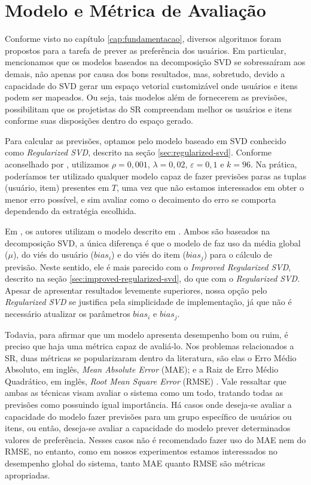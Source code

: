 \section{Modelo e Métrica de Avaliação}
\label{sec:modelo-avaliacao}

Conforme visto no capítulo \ref{cap:fundamentacao}, diversos algoritmos foram propostos para a tarefa de prever as preferência dos usuários. Em particular, mencionamos que os modelos baseados na decomposição SVD se sobressaíram aos demais, não apenas por causa dos bons resultados, mas, sobretudo, devido a capacidade do SVD gerar um espaço vetorial customizável onde usuários e itens podem ser mapeados. Ou seja, tais modelos além de fornecerem as previsões, possibilitam que os projetistas do SR compreendam melhor os usuários e itens conforme suas disposições dentro do espaço gerado. 

Para calcular as previsões, optamos pelo modelo baseado em SVD conhecido como \textit{Regularized SVD}, descrito na seção \ref{sec:regularized-svd}. Conforme aconselhado por \citep{paterek_2007}, utilizamos $\rho=0,001$, $\lambda=0,02$, $\varepsilon=0,1$ e $k=96$. Na prática, poderíamos ter utilizado qualquer modelo capaz de fazer previsões paras as tuplas (usuário, item) presentes em $T$, uma vez que não estamos interessados em obter o menor erro possível, e sim avaliar como o decaimento do erro se comporta dependendo da estratégia escolhida.

Em \citep{Elahi:2014:ALS:2542182.2542195}, os autores utilizam o modelo descrito em \citep{KorenBell_2011}. Ambos são baseados na decomposição SVD, a única diferença é que o modelo de \citep{KorenBell_2011} faz uso da média global ($\mu$), do viés do usuário ($bias_i$) e do viés do item ($bias_j$) para o cálculo de previsão. Neste sentido, ele é mais parecido com o \textit{Improved Regularized SVD}, descrito na seção \ref{sec:improved-regularized-svd}, do que com o \textit{Regularized SVD}. Apesar de apresentar resultados levemente superiores, nossa opção pelo \textit{Regularized SVD} se justifica pela simplicidade de implementação, já que não é necessário atualizar os parâmetros $bias_i$ e $bias_j$.

Todavia, para afirmar que um modelo apresenta desempenho bom ou ruim, é preciso que haja uma métrica capaz de avaliá-lo. Nos problemas relacionados a SR, duas métricas se popularizaram dentro da literatura, são elas o Erro Médio Absoluto, em inglês, \textit{Mean Absolute Error} (MAE); e a Raiz de Erro Médio Quadrático, em inglês, \textit{Root Mean Square Error} (RMSE) \citep{ricci_recommender_2011}. Vale ressaltar que ambas as técnicas visam avaliar o sistema como um todo, tratando todas as previsões como possuindo igual importância. Há casos onde deseja-se avaliar a capacidade do modelo fazer previsões para um grupo específico de usuários ou itens, ou então, deseja-se avaliar a capacidade do modelo prever determinados valores de preferência. Nesses casos não é recomendado fazer uso do MAE nem do RMSE, no entanto, como em nossos experimentos estamos interessados no desempenho global do sistema, tanto MAE quanto RMSE são métricas apropriadas.

